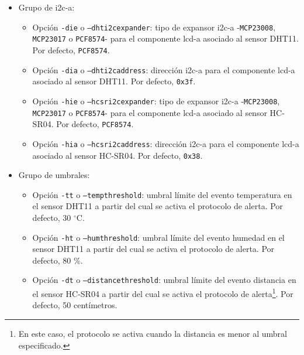 \documentclass[12pt,a4paper, twoside]{report}
\begin{document}
\begin{itemize}
		\item Grupo de \gls{i2c-a}:
		\begin{itemize}
			\item Opción \texttt{-die} o \texttt{--dhti2cexpander}: tipo de expansor \gls{i2c-a} -\texttt{MCP23008}, \texttt{MCP23017} o \texttt{PCF8574}- para el componente \gls{lcd-a} asociado al \gls{sensor} DHT11. Por defecto, \texttt{PCF8574}.
			
			\item Opción \texttt{-dia} o \texttt{--dhti2caddress}: dirección \gls{i2c-a} para el componente \gls{lcd-a} asociado al \gls{sensor} DHT11. Por defecto, \texttt{0x3f}.
			
			\item Opción \texttt{-hie} o \texttt{--hcsri2cexpander}: tipo de expansor \gls{i2c-a} -\texttt{MCP23008}, \texttt{MCP23017} o \texttt{PCF8574}- para el componente \gls{lcd-a} asociado al \gls{sensor} HC-SR04. Por defecto, \texttt{PCF8574}.
			
			\item Opción \texttt{-hia} o \texttt{--hcsri2caddress}: dirección \gls{i2c-a} para el componente \gls{lcd-a} asociado al \gls{sensor} HC-SR04. Por defecto, \texttt{0x38}.
		\end{itemize}
		
		\item Grupo de umbrales:
		\begin{itemize}
			\item Opción \texttt{-tt} o \texttt{--tempthreshold}: umbral límite del evento temperatura en el \gls{sensor} DHT11 a partir del cual se activa el protocolo de alerta. Por defecto, 30 $^{\circ}$C.
			\item Opción \texttt{-ht} o \texttt{--humthreshold}: umbral límite del evento humedad en el \gls{sensor} DHT11 a partir del cual se activa el protocolo de alerta. Por defecto, 80 \%.
			\item Opción \texttt{-dt} o \texttt{--distancethreshold}: umbral límite del evento distancia en el \gls{sensor} HC-SR04 a partir del cual se activa el protocolo de alerta\footnote{En este caso, el protocolo se activa cuando la distancia es menor al umbral especificado.}. Por defecto, 50 centímetros.
		\end{itemize}
	\end{itemize}
	
\end{document}
